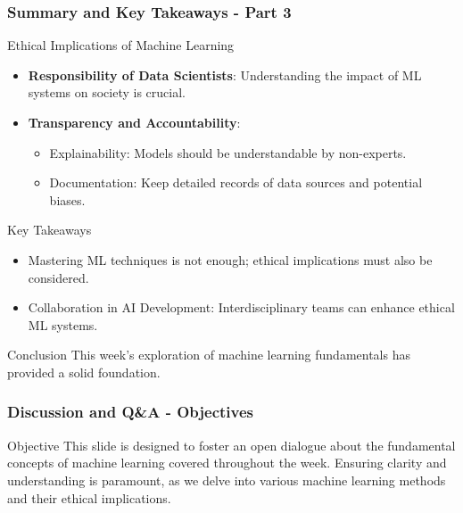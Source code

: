\documentclass[aspectratio=169]{beamer}
\begin{document}
\begin{frame}[fragile]
    \frametitle{Summary and Key Takeaways - Part 3}
    \begin{block}{Ethical Implications of Machine Learning}
        \begin{itemize}
            \item \textbf{Responsibility of Data Scientists}: Understanding the impact of ML systems on society is crucial. 
            \item \textbf{Transparency and Accountability}:
            \begin{itemize}
                \item Explainability: Models should be understandable by non-experts.
                \item Documentation: Keep detailed records of data sources and potential biases.
            \end{itemize}
        \end{itemize}
    \end{block}

    \begin{block}{Key Takeaways}
        \begin{itemize}
            \item Mastering ML techniques is not enough; ethical implications must also be considered.
            \item Collaboration in AI Development: Interdisciplinary teams can enhance ethical ML systems.
        \end{itemize}
    \end{block}
    
    \begin{block}{Conclusion}
        This week’s exploration of machine learning fundamentals has provided a solid foundation. 
    \end{block}
\end{frame}

\begin{frame}[fragile]
    \frametitle{Discussion and Q\&A - Objectives}
    \begin{block}{Objective}
        This slide is designed to foster an open dialogue about the fundamental concepts of machine learning covered throughout the week. Ensuring clarity and understanding is paramount, as we delve into various machine learning methods and their ethical implications.
    \end{block}
\end{frame}
\end{document}
